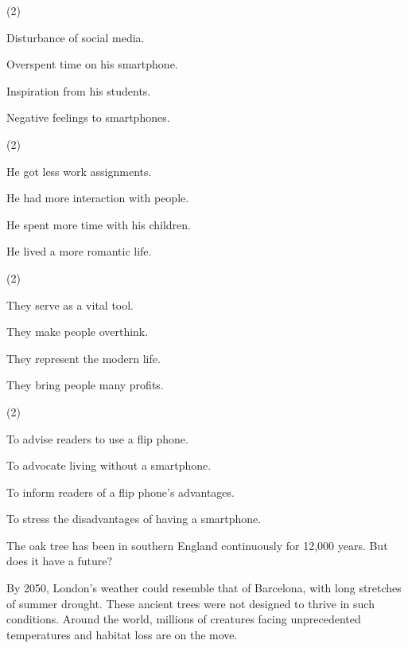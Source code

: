 \documentclass{英语试卷}
\begin{document}
\begin{choices}(2)
  \item Disturbance of social media.
  \item Overspent time on his smartphone.
  \item Inspiration from his students.
  \item Negative feelings to smartphones.
\end{choices}
\begin{choices}(2)
  \item He got less work assignments.
  \item He had more interaction with people.
  \item He spent more time with his children.
  \item He lived a more romantic life.
\end{choices}
\begin{choices}(2)
  \item They serve as a vital tool.
  \item They make people overthink.
  \item They represent the modern life.
  \item They bring people many profits.
\end{choices}
\begin{choices}(2)
  \item To advise readers to use a flip phone.
  \item To advocate living without a smartphone.
  \item To inform readers of a flip phone's advantages.
  \item To stress the disadvantages of having a smartphone.
\end{choices}
\par The oak tree has been in southern England continuously for 12,000 years. But does it have a future?\par
\par By 2050, London's weather could resemble that of Barcelona, with long stretches of summer drought. These ancient trees were not designed to thrive in such conditions. Around the world, millions of creatures facing unprecedented temperatures and habitat loss are on the move.\par
\end{document}
